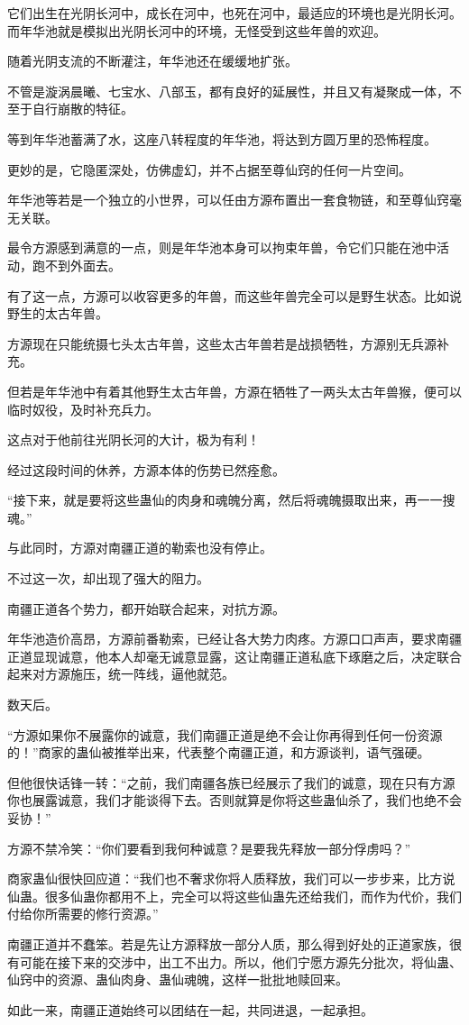 \begin{this_body}
它们出生在光阴长河中，成长在河中，也死在河中，最适应的环境也是光阴长河。而年华池就是模拟出光阴长河中的环境，无怪受到这些年兽的欢迎。

随着光阴支流的不断灌注，年华池还在缓缓地扩张。

不管是漩涡晨曦、七宝水、八部玉，都有良好的延展性，并且又有凝聚成一体，不至于自行崩散的特征。

等到年华池蓄满了水，这座八转程度的年华池，将达到方圆万里的恐怖程度。

更妙的是，它隐匿深处，仿佛虚幻，并不占据至尊仙窍的任何一片空间。

年华池等若是一个独立的小世界，可以任由方源布置出一套食物链，和至尊仙窍毫无关联。

最令方源感到满意的一点，则是年华池本身可以拘束年兽，令它们只能在池中活动，跑不到外面去。

有了这一点，方源可以收容更多的年兽，而这些年兽完全可以是野生状态。比如说野生的太古年兽。

方源现在只能统摄七头太古年兽，这些太古年兽若是战损牺牲，方源别无兵源补充。

但若是年华池中有着其他野生太古年兽，方源在牺牲了一两头太古年兽猴，便可以临时奴役，及时补充兵力。

这点对于他前往光阴长河的大计，极为有利！

经过这段时间的休养，方源本体的伤势已然痊愈。

“接下来，就是要将这些蛊仙的肉身和魂魄分离，然后将魂魄摄取出来，再一一搜魂。”

与此同时，方源对南疆正道的勒索也没有停止。

不过这一次，却出现了强大的阻力。

南疆正道各个势力，都开始联合起来，对抗方源。

年华池造价高昂，方源前番勒索，已经让各大势力肉疼。方源口口声声，要求南疆正道显现诚意，他本人却毫无诚意显露，这让南疆正道私底下琢磨之后，决定联合起来对方源施压，统一阵线，逼他就范。

数天后。

“方源如果你不展露你的诚意，我们南疆正道是绝不会让你再得到任何一份资源的！”商家的蛊仙被推举出来，代表整个南疆正道，和方源谈判，语气强硬。

但他很快话锋一转：“之前，我们南疆各族已经展示了我们的诚意，现在只有方源你也展露诚意，我们才能谈得下去。否则就算是你将这些蛊仙杀了，我们也绝不会妥协！”

方源不禁冷笑：“你们要看到我何种诚意？是要我先释放一部分俘虏吗？”

商家蛊仙很快回应道：“我们也不奢求你将人质释放，我们可以一步步来，比方说仙蛊。很多仙蛊你都用不上，完全可以将这些仙蛊先还给我们，而作为代价，我们付给你所需要的修行资源。”

南疆正道并不蠢笨。若是先让方源释放一部分人质，那么得到好处的正道家族，很有可能在接下来的交涉中，出工不出力。所以，他们宁愿方源先分批次，将仙蛊、仙窍中的资源、蛊仙肉身、蛊仙魂魄，这样一批批地赎回来。

如此一来，南疆正道始终可以团结在一起，共同进退，一起承担。

\end{this_body}


